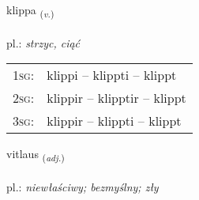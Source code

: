 \documentclass[frontgrid, backgrid]{flacards}\usepackage[]{graphicx}\usepackage[]{xcolor}
\begin{document}
\renewcommand{\flhead}{\vskip5pt \fboxsep=0pt {\small\bfseries\footnotesize Sagnorð | czasownik}}
\renewcommand{\fcfoot}{\vskip5pt \fboxsep=0pt \hspace{2pt}{\small\bfseries\footnotesize 3K}}

\renewcommand{\blhead}{\vskip5pt {\small\bfseries\footnotesize Sagnorð | czasownik }}
\renewcommand{\bcfoot}{\vskip5pt \hspace{2pt}{\small\bfseries\footnotesize 3K}}


{klippa \small{\textsubscript{(\textit{v.})}} \\[1ex] %
\textphonetic{[kʰlɪhpa]} \\
pl.: \emph{strzyc, ciąć} \\  [2ex]
\renewcommand*{\arraystretch}{0.8}
\begin{tabular}{p{1cm}l}
\textsc{1sg}: & klippi -- klippti -- klippt \\ 
\textsc{2sg}: & klippir -- klipptir -- klippt \\ 
\textsc{3sg}: & klippir -- klippti -- klippt \\ 
\end{tabular}
}

\renewcommand{\flhead}{\vskip5pt \fboxsep=0pt {\small\bfseries\footnotesize Lýsingarorð | przymiotnik}}
\renewcommand{\fcfoot}{\vskip5pt \fboxsep=0pt \hspace{2pt}{\small\bfseries\footnotesize 3K}}

\renewcommand{\blhead}{\vskip5pt {\small\bfseries\footnotesize Lýsingarorð | przymiotnik }}
\renewcommand{\bcfoot}{\vskip5pt \hspace{2pt}{\small\bfseries\footnotesize 3K}}


{vitlaus \small{\textsubscript{(\textit{adj.})}} \\[1ex] %
\textphonetic{[vɪhtlœis]} \\
pl.: \emph{niewłaściwy; bezmyślny; zły} \\  [2ex]
\renewcommand*{\arraystretch}{0.8}
}
\end{document}
